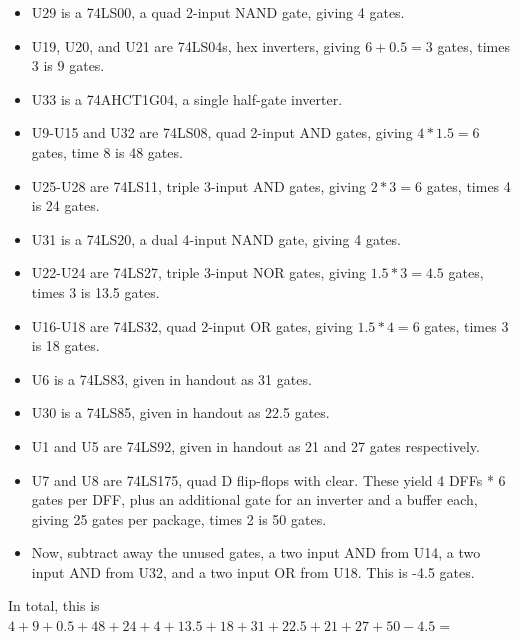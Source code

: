 \documentclass{article}
\begin{document}
\begin{enumerate}
        \begin{itemize}
            \item U29 is a 74LS00, a quad 2-input NAND gate, giving 4 gates.
            \item U19, U20, and U21 are 74LS04s, hex inverters, giving
                  $6+0.5 = 3$ gates, times 3 is 9 gates.
            \item U33 is a 74AHCT1G04, a single half-gate inverter.
            \item U9-U15 and U32 are 74LS08, quad 2-input AND gates, giving
                  $4 * 1.5 = 6$ gates, time 8 is 48 gates.
            \item U25-U28 are 74LS11, triple 3-input AND gates, giving
                  $2 * 3 = 6$ gates, times 4 is 24 gates.
            \item U31 is a 74LS20, a dual 4-input NAND gate, giving 4 gates.
            \item U22-U24 are 74LS27, triple 3-input NOR gates, giving
                  $1.5 * 3 = 4.5$ gates, times 3 is 13.5 gates.
            \item U16-U18 are 74LS32, quad 2-input OR gates, giving
                  $1.5 * 4 = 6$ gates, times 3 is 18 gates.
            \item U6 is a 74LS83, given in handout as 31 gates.
            \item U30 is a 74LS85, given in handout as 22.5 gates.
            \item U1 and U5 are 74LS92, given in handout as 21 and 27 gates
                  respectively.
            \item U7 and U8 are 74LS175, quad D flip-flops with clear. These
                  yield 4 DFFs * 6 gates per DFF, plus an additional gate for
                  an inverter and a buffer each, giving 25 gates per package,
                  times 2 is 50 gates.
            \item Now, subtract away the unused gates, a two input AND from U14,
                  a two input AND from U32, and a two input OR from U18. This is
                  -4.5 gates.
        \end{itemize}

        In total, this is $4 + 9 + 0.5 + 48 + 24 + 4 + 13.5 + 18 + 31 + 22.5 + 
        21 + 27 + 50 - 4.5 = $ 

    \end{enumerate}

    \pagebreak
    
    \pagebreak
    
    \pagebreak
    
\end{document}
